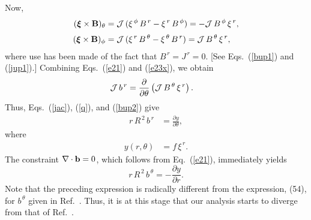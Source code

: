 \documentclass[12pt,prb,aps]{revtex4-1}
\newcommand {\bxi}{\mbox{\boldmath$\xi$}}
\begin{document}
Now,\cite{tj}
\begin{align}
(\bxi\times {\bf B})_\theta&= {\cal J}\,(\xi^{\,\phi}\,B^{\,r} - \xi^{\,r}\,B^{\,\phi}) = -{\cal J}\,B^{\,\phi}\,\xi^{\,r},\\[0.5ex]
(\bxi\times {\bf B})_\phi &= {\cal J}\,(\xi^{\,r}\,B^{\,\theta} - \xi^{\,\theta}\,B^{\,r})= {\cal J}\,B^{\,\theta}\,\xi^{\,r},\label{e23x}
\end{align}
where use has been made of  the fact that $B^{\,r}=J^{\,r}=0$. [See Eqs.~(\ref{bup1}) and (\ref{jup1}).]
 Combining Eqs.~(\ref{e21}) and (\ref{e23x}), we obtain
\begin{align}
{\cal J}\,b^{\,r} &= \frac{\partial}{\partial\theta}\left({\cal J}\,B^{\,\theta}\,\xi^{\,r}\right).
\end{align}
Thus, Eqs.~(\ref{jac}), (\ref{q}),  and (\ref{bup2}) give\,\cite{tj}
\begin{align}\label{e41}
r\,R^{\,2}\,b^{\,r}& = \frac{\partial y}{\partial\theta},
\end{align}
where 
\begin{align}\label{e42}
y(r,\theta) &=f\,\xi^{\,r}.
\end{align}
The constraint $\nabla\cdot{\bf b} =0$, which follows from Eq.~(\ref{e21}),  immediately yields
\begin{equation}\label{e43y}
r\,R^{\,2}\,b^{\,\theta} = - \frac{\partial y}{\partial r}.
\end{equation}
Note that the preceding expression is radically different from the expression, (54), for $b^{\,\theta}$ given in Ref.~. Thus, it is at this stage that our analysis
starts to diverge from that of Ref.~.
\end{document}
